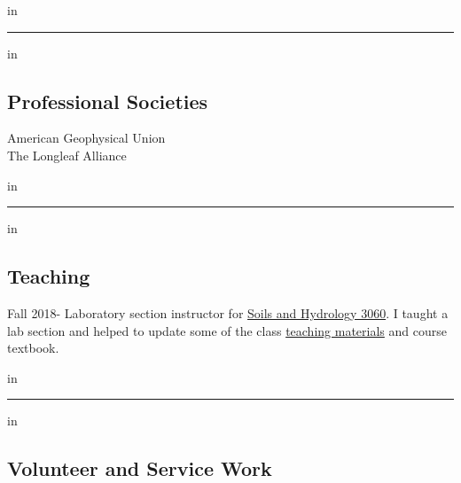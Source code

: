 \documentclass[10pt,letterpaper]{article}
\begin{document}
	 in
	
	\hrule
	\vspace{-0.4em}
	 in
	\subsection*{Professional Societies}
	
	American Geophysical Union \\
	The Longleaf Alliance
	
	 in
	
	\hrule
	\vspace{-0.4em}
	 in
	\subsection*{Teaching}
	
	Fall 2018- Laboratory section instructor for \href{http://www.hydrology.uga.edu/rasmussen/class/3060/index.html}{Soils and Hydrology 3060}. I taught a lab section and helped to update some of the class \href{https://seyounger.github.io/soils_and_hydro_teaching/}{teaching materials} and course textbook.
	
	 in
	
	\hrule
	\vspace{-0.4em}
	 in
	\subsection*{Volunteer and Service Work}
	
\end{document}
